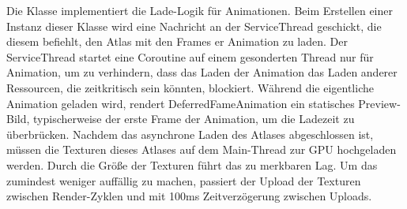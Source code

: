 Die  Klasse implementiert die Lade-Logik für Animationen.
Beim Erstellen einer Instanz dieser Klasse wird eine Nachricht an der ServiceThread geschickt, die diesem befiehlt,
den Atlas mit den Frames er Animation zu laden.
Der ServiceThread startet eine Coroutine auf einem gesonderten Thread nur für Animation, um zu verhindern, dass das
Laden der Animation das Laden anderer Ressourcen, die zeitkritisch sein könnten, blockiert.
Während die eigentliche Animation geladen wird, rendert DeferredFameAnimation ein statisches Preview-Bild,
typischerweise der erste Frame der Animation, um die Ladezeit zu überbrücken.
Nachdem das asynchrone Laden des Atlases abgeschlossen ist, müssen die Texturen dieses Atlases
auf dem Main-Thread zur GPU hochgeladen werden.
Durch die Größe der Texturen führt das zu merkbaren Lag.
Um das zumindest weniger auffällig zu machen, passiert der Upload der Texturen zwischen Render-Zyklen und mit 100ms
Zeitverzögerung zwischen Uploads.

\renewcommand{\kapitelautor}{}
